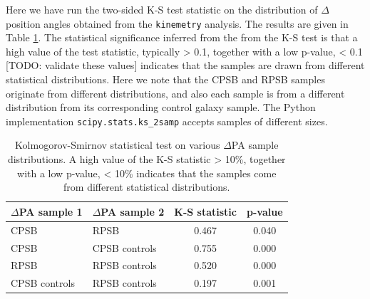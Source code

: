 Here we have run the two-sided K-S test statistic on the distribution of $\Delta$ position angles obtained from the \texttt{kinemetry} analysis. The results are given in Table \ref{tab:K-S-tests}. The statistical significance inferred from the from the K-S test is that a high value of the test statistic, typically > 0.1, together with a low p-value, < 0.1 [TODO: validate these values] indicates that the samples are drawn from different statistical distributions. Here we note that the CPSB and RPSB samples originate from different distributions, and also each sample is from a different distribution from its corresponding control galaxy sample. The Python implementation \texttt{scipy.stats.ks\_2samp} accepts samples of different sizes.

\begin{table}
\caption[Kolmogorov-Smirnov statistical test]{Kolmogorov-Smirnov statistical test on various $\Delta$PA sample distributions. A high value of the K-S statistic > 10\%, together with a low p-value, < 10\% indicates that the samples come from different statistical distributions.}
\label{tab:K-S-tests}
\begin{tabular}{llcc}
\hline
$\Delta$PA sample 1  & $\Delta$PA sample 2 & K-S statistic & p-value \\
\hline
CPSB & RPSB & 0.467 & 0.040 \\
CPSB & CPSB controls & 0.755 & 0.000 \\
RPSB & RPSB controls & 0.520 & 0.000 \\
CPSB controls & RPSB controls & 0.197 & 0.001 \\
\hline
\end{tabular}
\end{table}
